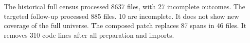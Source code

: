 The historical full census processed 8637 files, with 27 incomplete outcomes. The targeted follow-up processed 885 files. 10 are incomplete. It does not show new coverage of the full universe. The composed patch replaces 87 spans in 46 files. It removes 310 code lines after all preparation and imports.
